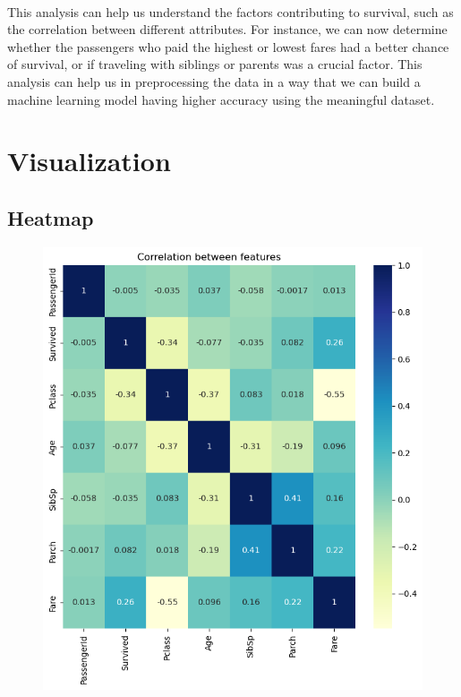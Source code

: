 \documentclass[a4paper, 12pt]{article}
\begin{document}
\paragraph*{}
This analysis can help us understand the factors contributing to survival, such as the correlation between different attributes. For instance, we can now determine whether the passengers who paid the highest or lowest fares had a better chance of survival, or if traveling with siblings or parents was a crucial factor. This analysis can help us in preprocessing the data in a way that we can build a machine learning model having higher accuracy using the meaningful dataset.

\cleardoublepage

\section*{Visualization}

\subsection*{Heatmap}

\begin{figure}[h]
  \centering
  \includegraphics[width=13cm]{heatmap}
\end{figure}
\end{document}

